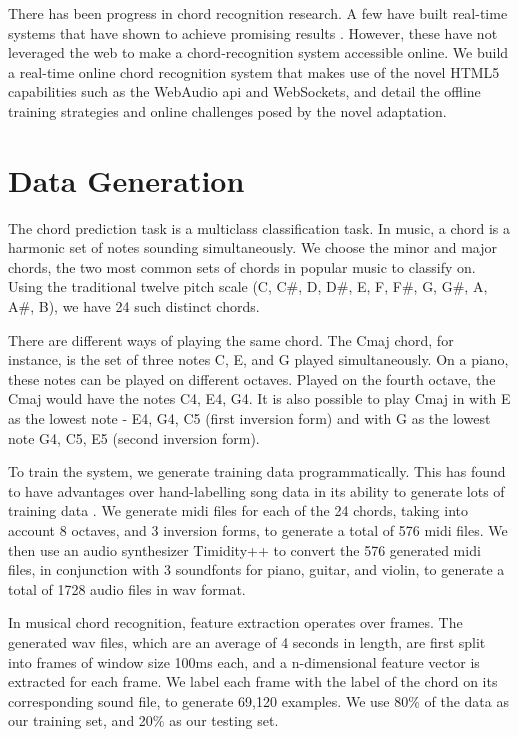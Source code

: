 \documentclass{article}
\begin{document}
There has been progress in chord recognition research. A few have built
real-time systems that have shown to achieve promising results \cite{fujishima,
cho}. However, these have not leveraged the web to make a chord-recognition
system accessible online. We build a real-time online chord recognition system
that makes use of the novel HTML5 capabilities such as the WebAudio api and
WebSockets, and detail the offline training strategies and online challenges
posed by the novel adaptation.

\section{Data Generation}
The chord prediction task is a multiclass classification task. In music, a chord
is a harmonic set of notes sounding simultaneously. We choose the minor and
major chords, the two most common sets of chords in popular music to classify
on. Using the traditional twelve pitch scale (C, C\#, D, D\#, E, F, F\#, G, G\#,
A, A\#, B), we have 24 such distinct chords.

There are different ways of playing the same chord. The Cmaj chord, for
instance, is the set of three notes C, E, and G played simultaneously. On a
piano, these notes can be played on different octaves. Played on the fourth
octave, the Cmaj would have the notes C4, E4, G4. It is also possible to play
Cmaj in with E as the lowest note - E4, G4, C5 (first inversion form) and with G
as the lowest note G4, C5, E5 (second inversion form).

To train the system, we generate training data programmatically. This has found
to have advantages over hand-labelling song data in its ability to generate lots
of training data \cite{lee}. We generate midi files for each of the 24 chords,
taking into account 8 octaves, and 3 inversion forms, to generate a total of 576
midi files. We then use an audio synthesizer Timidity++ to convert the 576
generated midi files, in conjunction with 3 soundfonts for piano, guitar, and
violin, to generate a total of 1728 audio files in wav format.

In musical chord recognition, feature extraction operates over frames. The
generated wav files, which are an average of 4 seconds in length, are first
split into frames of window size 100ms each, and a n-dimensional feature vector
is extracted for each frame. We label each frame with the label of the chord on
its corresponding sound file, to generate 69,120 examples. We use 80\% of the
data as our training set, and 20\% as our testing set.
\end{document}
